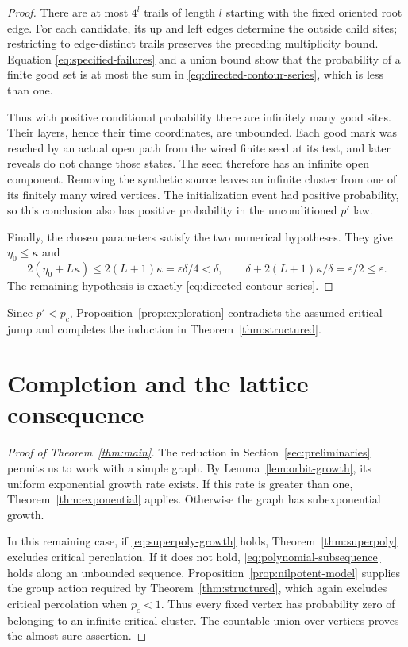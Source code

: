 \documentclass[11pt]{article}
\theoremstyle{definition}
\begin{document}
\begin{proof}
There are at most $4^l$ trails of length $l$ starting with the fixed
oriented root edge. For each candidate, its up and left edges
determine the outside child sites; restricting to edge-distinct
trails preserves the preceding multiplicity bound. Equation
\eqref{eq:specified-failures} and a union bound show that the
probability of a finite good set is at most the sum in
\eqref{eq:directed-contour-series}, which is less than one.

Thus with positive conditional probability there are infinitely
many good sites. Their layers, hence their time coordinates, are
unbounded. Each good mark was reached by an actual open path from
the wired finite seed at its test, and later reveals do not change
those states. The seed therefore has an infinite open component.
Removing the synthetic source leaves an infinite cluster from one
of its finitely many wired vertices. The initialization event had
positive probability, so this conclusion also has positive
probability in the unconditioned $p'$ law.

Finally, the chosen parameters satisfy the two numerical hypotheses.
They give $\eta_0\le\kappa$ and
\[
 2(\eta_0+L\kappa)\le2(L+1)\kappa
   =\varepsilon\delta/4<\delta,
 \qquad
 \delta+2(L+1)\kappa/\delta=\varepsilon/2\le\varepsilon.
\]
The remaining hypothesis is exactly
\eqref{eq:directed-contour-series}.
\end{proof}

Since $p'<p_c$, Proposition~\ref{prop:exploration} contradicts the
assumed critical jump and completes the induction in
Theorem~\ref{thm:structured}.

\section{Completion and the lattice consequence}
\label{sec:completion}

\begin{proof}[Proof of Theorem~\ref{thm:main}]
The reduction in Section~\ref{sec:preliminaries} permits us to work
with a simple graph. By Lemma~\ref{lem:orbit-growth}, its uniform
exponential growth rate exists. If this rate is greater than one,
Theorem~\ref{thm:exponential} applies. Otherwise the graph has
subexponential growth.

In this remaining case, if \eqref{eq:superpoly-growth} holds,
Theorem~\ref{thm:superpoly} excludes critical percolation. If it does
not hold, \eqref{eq:polynomial-subsequence} holds along an unbounded
sequence. Proposition~\ref{prop:nilpotent-model} supplies the group
action required by Theorem~\ref{thm:structured}, which again excludes
critical percolation when $p_c<1$. Thus every fixed vertex has
probability zero of belonging to an infinite critical cluster.
The countable union over vertices proves the almost-sure assertion.
\end{proof}
\end{document}

